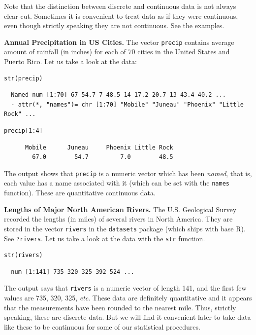 \documentclass[captions=tableheading]{scrbook}
\begin{document}
Note that the distinction between discrete and continuous data is not always clear-cut. Sometimes it is convenient to treat data as if they were continuous, even though strictly speaking they are not continuous. See the examples.

\begin{example}
\textbf{Annual Precipitation in US Cities.} The vector \texttt{precip} contains average amount of rainfall (in inches) for each of 70 cities in the United States and Puerto Rico. Let us take a look at the data:


\begin{verbatim}
str(precip)
\end{verbatim}

\begin{verbatim}
  Named num [1:70] 67 54.7 7 48.5 14 17.2 20.7 13 43.4 40.2 ...
  - attr(*, "names")= chr [1:70] "Mobile" "Juneau" "Phoenix" "Little Rock" ...
\end{verbatim}


\begin{verbatim}
precip[1:4]
\end{verbatim}

\begin{verbatim}
      Mobile      Juneau     Phoenix Little Rock 
        67.0        54.7         7.0        48.5
\end{verbatim}

The output shows that \texttt{precip} is a numeric vector which has been \emph{named}, that is, each value has a name associated with it (which can be set with the \texttt{names} function). These are quantitative continuous data.

\end{example}

\begin{example}
\textbf{Lengths of Major North American Rivers.} The U.S. Geological Survey recorded the lengths (in miles) of several rivers in North America. They are stored in the vector \texttt{rivers} in the \texttt{datasets} package (which ships with base \textsf{R}). See \texttt{?rivers}. Let us take a look at the data with the \texttt{str} function.


\begin{verbatim}
str(rivers)
\end{verbatim}

\begin{verbatim}
  num [1:141] 735 320 325 392 524 ...
\end{verbatim}


The output says that \texttt{rivers} is a numeric vector of length 141, and the first few values are 735, 320, 325, \emph{etc}. These data are definitely quantitative and it appears that the measurements have been rounded to the nearest mile. Thus, strictly speaking, these are discrete data. But we will find it convenient later to take data like these to be continuous for some of our statistical procedures. 
\end{example}
\end{document}
